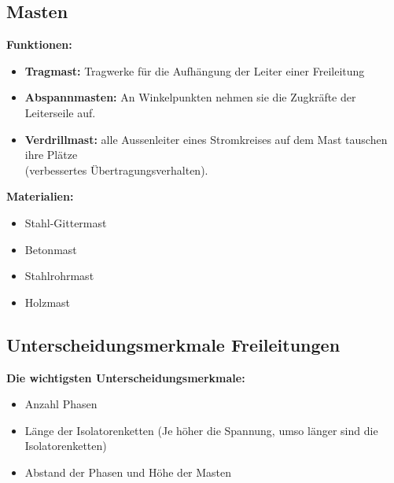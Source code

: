 \subsection{Masten}

\textbf{Funktionen:}
\begin{itemize}
    \item \textbf{Tragmast:} Tragwerke für die Aufhängung der Leiter einer Freileitung
    \item \textbf{Abspannmasten:} An Winkelpunkten nehmen sie die Zugkräfte der Leiterseile auf.
    \item \textbf{Verdrillmast:} alle Aussenleiter eines Stromkreises auf dem Mast tauschen ihre Plätze\\
    (verbessertes Übertragungsverhalten).
\end{itemize}

\vspace{1em}
\textbf{Materialien:}
\begin{itemize}
    \item Stahl-Gittermast
    \item Betonmast
    \item Stahlrohrmast
    \item Holzmast
\end{itemize}


\subsection{Unterscheidungsmerkmale Freileitungen}

\textbf{Die wichtigsten Unterscheidungsmerkmale:}

\begin{itemize}
    \item Anzahl Phasen
    \item Länge der Isolatorenketten (Je höher die Spannung, umso länger sind die Isolatorenketten)
    \item Abstand der Phasen und Höhe der Masten
\end{itemize}

